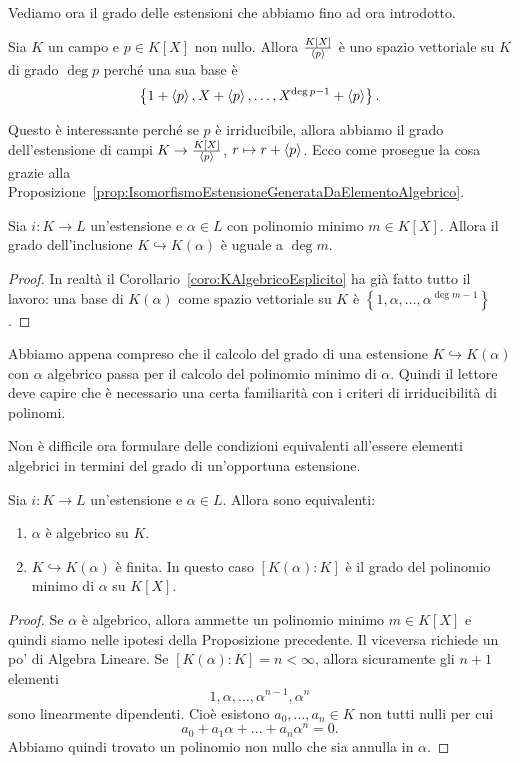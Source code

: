 Vediamo ora il grado delle estensioni che abbiamo fino ad ora introdotto.

\begin{esem}
Sia $K$ un campo e $p \in K[X]$ non nullo. Allora $\frac{K[X]}{\left\langle p\right\rangle}$ è uno spazio vettoriale su $K$ di grado $\deg p$ perché una sua base è
\[\left\{1 + \left\langle p\right\rangle, X + \left\langle p\right\rangle, \dots{}, X^{\deg p -1} + \left\langle p\right\rangle\right\} .\]
\end{esem}

Questo è interessante perché se $p$ è irriducibile, allora abbiamo il grado dell'estensione di campi $K \to \frac{K[X]}{\left\langle p\right\rangle}$, $r \mapsto r + \left\langle p\right\rangle$. Ecco come prosegue la cosa grazie alla Proposizione~\ref{prop:IsomorfismoEstensioneGenerataDaElementoAlgebrico}.

\begin{prop}\label{prop:GradoEstensioneKAlgebrico}
Sia $i : K \to L$ un'estensione e $\alpha \in L$ con polinomio minimo $m \in K[X]$. Allora il grado dell'inclusione $K \hookrightarrow K(\alpha)$ è uguale a $\deg m$.
\end{prop}

\begin{proof}
In realtà il Corollario~\ref{coro:KAlgebricoEsplicito} ha già fatto tutto il lavoro: una base di $K(\alpha)$ come spazio vettoriale su $K$ è $\left\{1, \alpha, \dots{}, \alpha^{\deg m -1}\right\}$.
\end{proof}

Abbiamo appena compreso che il calcolo del grado di una estensione $K \hookrightarrow K(\alpha)$ con $\alpha$ algebrico passa per il calcolo del polinomio minimo di $\alpha$. Quindi il lettore deve capire che è necessario una certa familiarità con i criteri di irriducibilità di polinomi.

Non è difficile ora formulare delle condizioni equivalenti all'essere elementi algebrici in termini del grado di un'opportuna estensione. 

\begin{prop}
Sia $i : K \to L$ un'estensione e $\alpha \in L$. Allora sono equivalenti:
\begin{enumerate}
\item $\alpha$ è algebrico su $K$.
\item $K \hookrightarrow K(\alpha)$ è finita. In questo caso $[K(\alpha):K]$ è il grado del polinomio minimo di $\alpha$ su $K[X]$.
\end{enumerate}
\end{prop}

\begin{proof}
Se $\alpha$ è algebrico, allora ammette un polinomio minimo $m \in K[X]$ e quindi siamo nelle ipotesi della Proposizione precedente. Il viceversa richiede un po' di Algebra Lineare. Se $[K(\alpha):K] = n < \infty$, allora sicuramente gli $n+1$ elementi
\[1, \alpha, \dots{}, \alpha^{n-1}, \alpha^n\]
sono linearmente dipendenti. Cioè esistono $a_0, \dots{}, a_n \in K$ non tutti nulli per cui
\[a_0 + a_1 \alpha + \dots{} + a_n \alpha^n = 0 .\]
Abbiamo quindi trovato un polinomio non nullo che sia annulla in $\alpha$.  
\end{proof}


